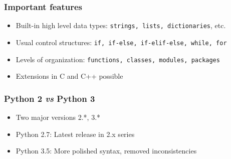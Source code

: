 \begin{frame}[fragile]  \frametitle{Important features}
\begin{itemize}
\item Built-in high level data types: \lstinline{strings, lists, dictionaries}, etc.
\item Usual control structures: \lstinline{if, if-else, if-elif-else, while, for}
\item Levels of organization: \lstinline{functions, classes, modules, packages}
\item Extensions in C and C++ possible
\end{itemize}
\end{frame}

\begin{frame}[fragile]  \frametitle{Python 2 \emph{vs} Python 3}
\begin{itemize}
\item Two major versions 2.*, 3.*
\item Python 2.7: Latest release in 2.x series
\item Python 3.5: More polished syntax, removed inconsistencies
\end{itemize}
\end{frame}
